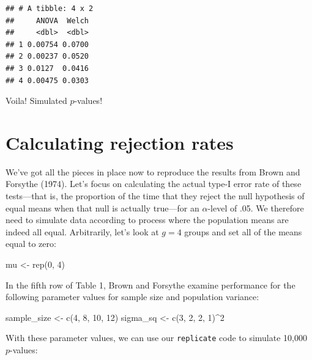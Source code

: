 \documentclass[
]{book}
\newenvironment{Shaded}{\begin{snugshade}}{\end{snugshade}}
\newcommand{\DecValTok}[1]{\textcolor[rgb]{0.00,0.00,0.81}{#1}}
\newcommand{\FunctionTok}[1]{\textcolor[rgb]{0.00,0.00,0.00}{#1}}
\newcommand{\NormalTok}[1]{#1}
\newcommand{\OtherTok}[1]{\textcolor[rgb]{0.56,0.35,0.01}{#1}}
\newcommand{\SpecialCharTok}[1]{\textcolor[rgb]{0.00,0.00,0.00}{#1}}
\begin{document}
\begin{verbatim}
## # A tibble: 4 x 2
##     ANOVA  Welch
##     <dbl>  <dbl>
## 1 0.00754 0.0700
## 2 0.00237 0.0520
## 3 0.0127  0.0416
## 4 0.00475 0.0303
\end{verbatim}

Voila! Simulated \(p\)-values!

\hypertarget{calculating-rejection-rates}{%
\section{Calculating rejection rates}\label{calculating-rejection-rates}}

We've got all the pieces in place now to reproduce the results from Brown and Forsythe (1974). Let's focus on calculating the actual type-I error rate of these tests---that is, the proportion of the time that they reject the null hypothesis of equal means when that null is actually true---for an \(\alpha\)-level of .05. We therefore need to simulate data according to process where the population means are indeed all equal. Arbitrarily, let's look at \(g = 4\) groups and set all of the means equal to zero:

\begin{Shaded}
\begin{Highlighting}[]
\NormalTok{mu }\OtherTok{\textless{}{-}} \FunctionTok{rep}\NormalTok{(}\DecValTok{0}\NormalTok{, }\DecValTok{4}\NormalTok{)}
\end{Highlighting}
\end{Shaded}

In the fifth row of Table 1, Brown and Forsythe examine performance for the following parameter values for sample size and population variance:

\begin{Shaded}
\begin{Highlighting}[]
\NormalTok{sample\_size }\OtherTok{\textless{}{-}} \FunctionTok{c}\NormalTok{(}\DecValTok{4}\NormalTok{, }\DecValTok{8}\NormalTok{, }\DecValTok{10}\NormalTok{, }\DecValTok{12}\NormalTok{)}
\NormalTok{sigma\_sq }\OtherTok{\textless{}{-}} \FunctionTok{c}\NormalTok{(}\DecValTok{3}\NormalTok{, }\DecValTok{2}\NormalTok{, }\DecValTok{2}\NormalTok{, }\DecValTok{1}\NormalTok{)}\SpecialCharTok{\^{}}\DecValTok{2}
\end{Highlighting}
\end{Shaded}

With these parameter values, we can use our \texttt{replicate} code to simulate 10,000 \(p\)-values:
\end{document}
